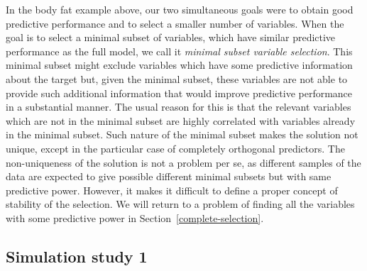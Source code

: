 \documentclass[a4]{article}
\let\rmarkdownfootnote\footnote%
\def\footnote{\protect\rmarkdownfootnote}
\theoremstyle{definition}
\begin{document}
In the body fat example above, our two simultaneous goals were to 
obtain good predictive performance and to select a smaller number of variables. 
When the goal is to select a minimal subset of variables,
which have similar predictive performance as the full model, we call it
\emph{minimal subset variable selection}. This minimal subset might
exclude variables which have some predictive information about the
target but, given the minimal subset, these variables are not able to
provide such additional information that would improve predictive
performance in a substantial manner.
The usual reason for this is that the relevant variables
which are not in the minimal subset are highly correlated with variables already in
the minimal subset. Such nature of the minimal subset makes the solution
not unique, except in the particular case of completely orthogonal predictors. 
The non-uniqueness of the solution is not a problem per se, as different samples of the data
are expected to give possible different minimal subsets but with same predictive power. 
However, it makes it difficult to define a proper
concept of stability of the selection.
We will return to a problem of finding all
the variables with some predictive power in Section~\ref{complete-selection}.
%

\subsection{Simulation study 1}\label{minimal-simulated}
\end{document}
